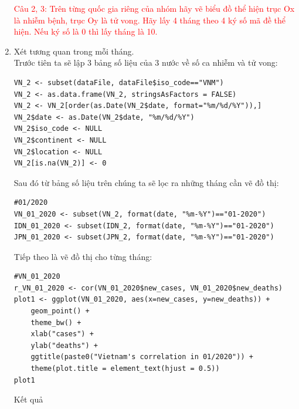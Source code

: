 \documentclass[a4paper]{article}
\theoremstyle{definition}
\begin{document}
\begin{enumerate}[1)]
\textcolor{red}{Câu 2, 3: Trên từng quốc gia riêng của nhóm hãy vẽ biểu đồ thể hiện trục Ox là nhiễm bệnh, trục Oy là tử vong. Hãy lấy 4 tháng theo 4 ký số mã đề thể hiện. Nếu ký số là 0 thì lấy tháng là 10.}
\item Xét tương quan trong mỗi tháng. \\
Trước tiên ta sẽ lập 3 bảng số liệu của 3 nước về số ca nhiễm và tử vong:
\begin{lstlisting}
VN_2 <- subset(dataFile, dataFile$iso_code=="VNM")
VN_2 <- as.data.frame(VN_2, stringsAsFactors = FALSE)
VN_2 <- VN_2[order(as.Date(VN_2$date, format="%m/%d/%Y")),]
VN_2$date <- as.Date(VN_2$date, "%m/%d/%Y")
VN_2$iso_code <- NULL
VN_2$continent <- NULL
VN_2$location <- NULL
VN_2[is.na(VN_2)] <- 0
\end{lstlisting}

Sau đó từ bảng số liệu trên chúng ta sẽ lọc ra những tháng cần vẽ đồ thị:
\begin{lstlisting}
#01/2020
VN_01_2020 <- subset(VN_2, format(date, "%m-%Y")=="01-2020")
IDN_01_2020 <- subset(IDN_2, format(date, "%m-%Y")=="01-2020")
JPN_01_2020 <- subset(JPN_2, format(date, "%m-%Y")=="01-2020")
\end{lstlisting}

Tiếp theo là vẽ đồ thị cho từng tháng:
\begin{lstlisting}
#VN_01_2020
r_VN_01_2020 <- cor(VN_01_2020$new_cases, VN_01_2020$new_deaths)
plot1 <- ggplot(VN_01_2020, aes(x=new_cases, y=new_deaths)) + 
    geom_point() + 
    theme_bw() + 
    xlab("cases") + 
    ylab("deaths") + 
    ggtitle(paste0("Vietnam's correlation in 01/2020")) + 
    theme(plot.title = element_text(hjust = 0.5))
plot1
\end{lstlisting}
Kết quả


\end{enumerate}
\end{document}
